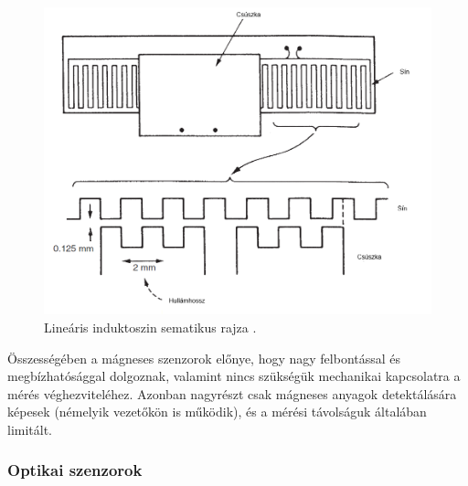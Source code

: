 \begin{itemize}
	\begin{figure}
		\centering
		\includegraphics[width=\columnwidth*8/10]{figures/indszin.png}
		\caption{Lineáris induktoszin sematikus rajza \cite{Morris2016a}.}
		\label{indszin}
	\end{figure}
\end{itemize}
Összességében a mágneses szenzorok előnye, hogy nagy felbontással és megbízhatósággal dolgoznak, valamint nincs szükségük mechanikai kapcsolatra a mérés véghezviteléhez. Azonban nagyrészt csak mágneses anyagok detektálására képesek (némelyik vezetőkön is működik), és a mérési távolságuk általában limitált.

\subsubsection{Optikai szenzorok}

